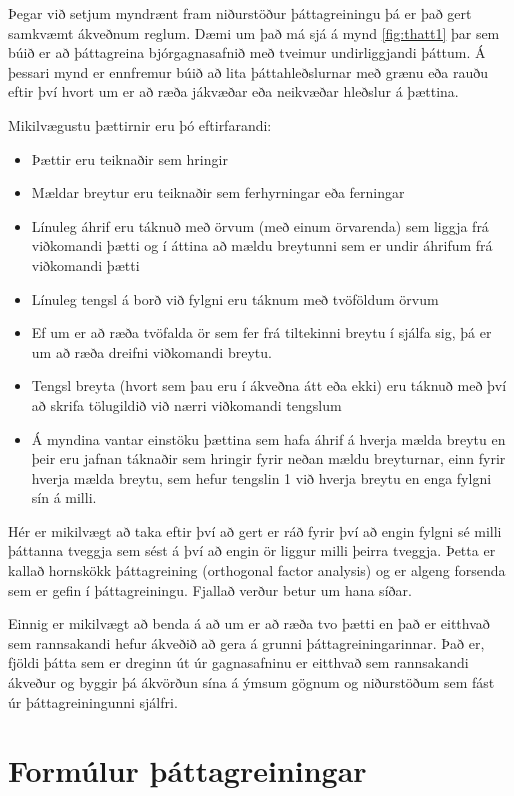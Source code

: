 \documentclass[]{book}
\providecommand{\tightlist}{%
  \setlength{\itemsep}{0pt}\setlength{\parskip}{0pt}}
\begin{document}
Þegar við setjum myndrænt fram niðurstöður þáttagreiningu þá er það gert samkvæmt ákveðnum reglum. Dæmi um það má sjá á mynd \ref{fig:thatt1} þar sem búið er að þáttagreina bjórgagnasafnið með tveimur undirliggjandi þáttum. Á þessari mynd er ennfremur búið að lita þáttahleðslurnar með grænu eða rauðu eftir því hvort um er að ræða jákvæðar eða neikvæðar hleðslur á þættina.

Mikilvægustu þættirnir eru þó eftirfarandi:

\begin{itemize}
\tightlist
\item
  Þættir eru teiknaðir sem hringir
\item
  Mældar breytur eru teiknaðir sem ferhyrningar eða ferningar
\item
  Línuleg áhrif eru táknuð með örvum (með einum örvarenda) sem liggja frá viðkomandi þætti og í áttina að mældu breytunni sem er undir áhrifum frá viðkomandi þætti
\item
  Línuleg tengsl á borð við fylgni eru táknum með tvöföldum örvum
\item
  Ef um er að ræða tvöfalda ör sem fer frá tiltekinni breytu í sjálfa sig, þá er um að ræða dreifni viðkomandi breytu.
\item
  Tengsl breyta (hvort sem þau eru í ákveðna átt eða ekki) eru táknuð með því að skrifa tölugildið við nærri viðkomandi tengslum
\item
  Á myndina vantar einstöku þættina sem hafa áhrif á hverja mælda breytu en þeir eru jafnan táknaðir sem hringir fyrir neðan mældu breyturnar, einn fyrir hverja mælda breytu, sem hefur tengslin 1 við hverja breytu en enga fylgni sín á milli.
\end{itemize}

Hér er mikilvægt að taka eftir því að gert er ráð fyrir því að engin fylgni sé milli þáttanna tveggja sem sést á því að engin ör liggur milli þeirra tveggja. Þetta er kallað hornskökk þáttagreining (orthogonal factor analysis) og er algeng forsenda sem er gefin í þáttagreiningu. Fjallað verður betur um hana síðar.

Einnig er mikilvægt að benda á að um er að ræða tvo þætti en það er eitthvað sem rannsakandi hefur ákveðið að gera á grunni þáttagreiningarinnar. Það er, fjöldi þátta sem er dreginn út úr gagnasafninu er eitthvað sem rannsakandi ákveður og byggir þá ákvörðun sína á ýmsum gögnum og niðurstöðum sem fást úr þáttagreiningunni sjálfri.

\hypertarget{formuxfalur-uxfeuxe1ttagreiningar}{%
\section{Formúlur þáttagreiningar}\label{formuxfalur-uxfeuxe1ttagreiningar}}
\end{document}
